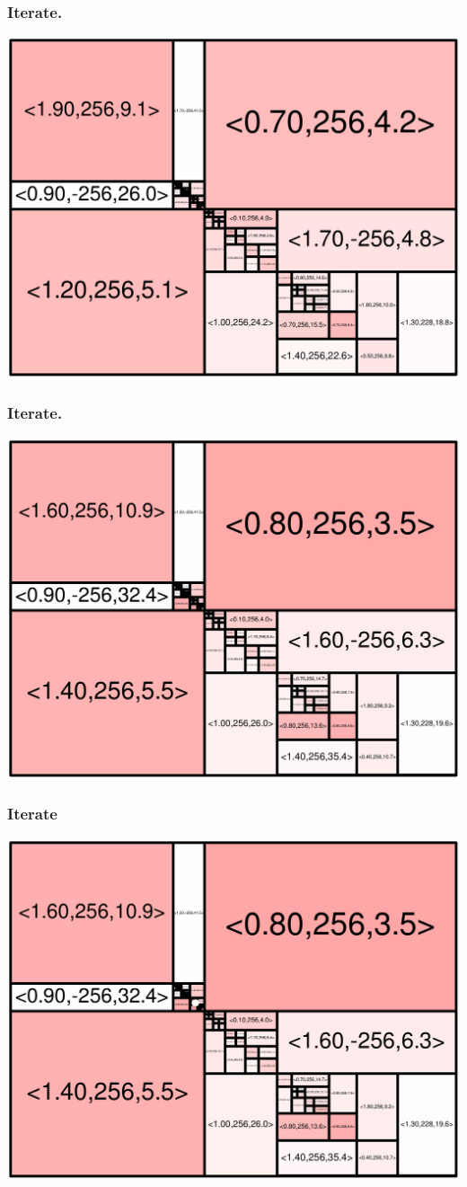 \begin{frame}
\frametitle{Iterate\hspace{10 cm}.}\begin{centering}\includegraphics[width=8.5 cm]{remy-graph/graph/test84.pdf}

\end{centering}\end{frame}


\begin{frame}
\frametitle{Iterate\hspace{10 cm}.}\begin{centering}\includegraphics[width=8.5 cm]{remy-graph/graph/test85.pdf}

\end{centering}\end{frame}


\begin{frame}
\frametitle{Iterate}\begin{centering}\includegraphics[width=8.5 cm]{remy-graph/graph/test86.pdf}

\end{centering}\end{frame}


